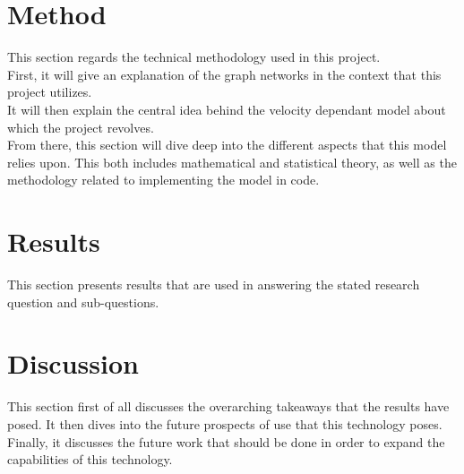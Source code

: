 \documentclass[11pt]{article}
\begin{document}

\clearpage



\section{Method}
\label{sec:Method}
This section regards the technical methodology used in this project.
\\
First, it will give an explanation of the graph networks in the context that this project utilizes. 
\\
It will then explain the central idea behind the velocity dependant model about which the project revolves. 
\\
From there, this section will dive deep into the different aspects that this model relies upon.
This both includes mathematical and statistical theory, as well as the methodology related to implementing the model in code.


%








\newpage

\clearpage


\section{Results}
\label{sec:Results}
This section presents results that are used in answering the stated research question and sub-questions.

\clearpage

\clearpage

\clearpage

\section{Discussion}
\label{sec:Discussion}
This section first of all discusses the overarching takeaways that the results have posed.
It then dives into the future prospects of use that this technology poses.
Finally, it discusses the future work that should be done in order to expand the capabilities of this technology.


\clearpage



\clearpage

%
%
\printbibliography
\clearpage


\end{document}
